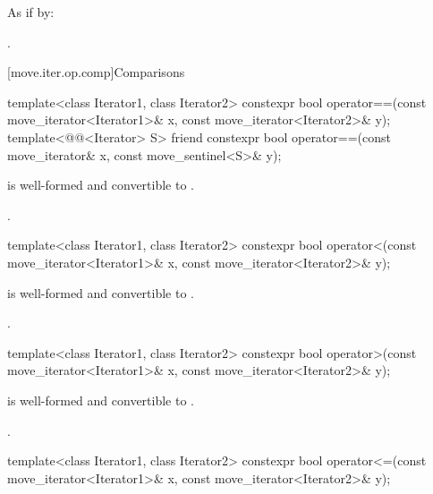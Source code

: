 \begin{itemdescr}
\pnum
\effects
As if by: 

\pnum
\returns
{}.
\end{itemdescr}

[move.iter.op.comp]{Comparisons}

%
\begin{itemdecl}
template<class Iterator1, class Iterator2>
  constexpr bool operator==(const move_iterator<Iterator1>& x,
                            const move_iterator<Iterator2>& y);
template<@@<Iterator> S>
  friend constexpr bool operator==(const move_iterator& x,
                                   const move_sentinel<S>& y);
\end{itemdecl}

\begin{itemdescr}
\pnum
\constraints
{} is well-formed and
convertible to .

\pnum
\returns
{}.
\end{itemdescr}

%
\begin{itemdecl}
template<class Iterator1, class Iterator2>
constexpr bool operator<(const move_iterator<Iterator1>& x, const move_iterator<Iterator2>& y);
\end{itemdecl}

\begin{itemdescr}
\pnum
\constraints
{} is well-formed and
convertible to .

\pnum
\returns
{}.
\end{itemdescr}

%
\begin{itemdecl}
template<class Iterator1, class Iterator2>
constexpr bool operator>(const move_iterator<Iterator1>& x, const move_iterator<Iterator2>& y);
\end{itemdecl}

\begin{itemdescr}
\pnum
\constraints
{} is well-formed and
convertible to .

\pnum
\returns
{}.
\end{itemdescr}

%
\begin{itemdecl}
template<class Iterator1, class Iterator2>
constexpr bool operator<=(const move_iterator<Iterator1>& x, const move_iterator<Iterator2>& y);
\end{itemdecl}

